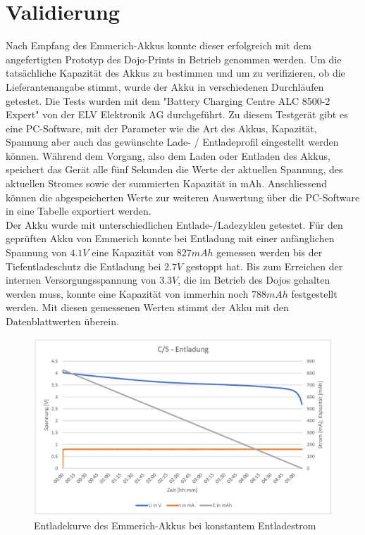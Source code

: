 \section{Validierung}

Nach Empfang des Emmerich-Akkus konnte dieser erfolgreich mit dem angefertigten Prototyp des Dojo-Prints in Betrieb genommen werden. Um die tatsächliche Kapazität des Akkus zu bestimmen und um zu verifizieren, ob die Lieferantenangabe stimmt, wurde der Akku in verschiedenen Durchläufen getestet. Die Tests wurden mit dem "Battery Charging Centre ALC 8500-2 Expert" von der ELV Elektronik AG durchgeführt. Zu diesem Testgerät gibt es eine PC-Software, mit der Parameter wie die Art des Akkus, Kapazität, Spannung aber auch das gewünschte Lade- / Entladeprofil eingestellt werden können. Während dem Vorgang, also dem Laden oder Entladen des Akkus, speichert das Gerät alle fünf Sekunden die Werte der aktuellen Spannung, des aktuellen Stromes sowie der summierten Kapazität in mAh. Anschliessend können die abgespeicherten Werte zur weiteren Auswertung über die PC-Software in eine Tabelle exportiert werden.\\

Der Akku wurde mit unterschiedlichen Entlade-/Ladezyklen getestet. Für den geprüften Akku von Emmerich konnte bei Entladung mit einer anfänglichen Spannung von $4.1V$ eine Kapazität von $827mAh$ gemessen werden bis der Tiefentladeschutz die Entladung bei $2.7V$ gestoppt hat. Bis zum Erreichen der internen Versorgungsspannung von $3.3V$, die im Betrieb des Dojos gehalten werden muss, konnte eine Kapazität von immerhin noch $788mAh$ festgestellt werden. Mit diesen gemessenen Werten stimmt der Akku mit den Datenblattwerten überein.\\

\begin{figure}[htp]
	\centering
	\includegraphics[width=15cm]{Bilder/Entladekurve.JPG}
	 \caption{Entladekurve des Emmerich-Akkus bei konstantem Entladestrom}
	 \label{fig:Entladekurve}
\end{figure}

